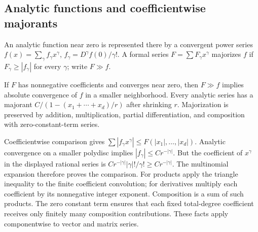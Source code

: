 \subsection{Analytic functions and coefficientwise majorants}
An analytic function near zero is represented there by a convergent
power series $f(x)=\sum_\gamma f_\gamma x^\gamma$,
$f_\gamma=D^\gamma f(0)/\gamma!$.
A formal series $F=\sum F_\gamma x^\gamma$ majorizes $f$ if
$F_\gamma\geq|f_\gamma|$ for every $\gamma$; write $F\gg f$.
\begin{lemma}
If $F$ has nonnegative coefficients and converges near zero, then
$F\gg f$ implies absolute convergence of $f$ in a smaller neighborhood.
Every analytic series has a majorant
$C/(1-(x_1+\cdots+x_d)/r)$ after shrinking $r$.
Majorization is preserved by addition, multiplication,
partial differentiation, and composition with zero-constant-term series.
\end{lemma}
\begin{expandedproof}
Coefficientwise comparison gives
$\sum|f_\gamma x^\gamma|\leq F(|x_1|,\ldots,|x_d|)$.
Analytic convergence on a smaller polydisc implies
$|f_\gamma|\leq C r^{-|\gamma|}$.
But the coefficient of $x^\gamma$ in the displayed rational series is
$Cr^{-|\gamma|}|\gamma|!/\gamma!\geq Cr^{-|\gamma|}$.
The multinomial expansion therefore proves the comparison.
For products apply the triangle inequality to the finite coefficient
convolution; for derivatives multiply each coefficient by its
nonnegative integer exponent. Composition is a sum of such products.
The zero constant term ensures that each fixed total-degree
coefficient receives only finitely many composition contributions.
These facts apply componentwise to vector and matrix series.
\end{expandedproof}
\Needspace{45mm}

\Needspace{35mm}
